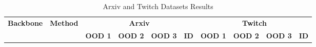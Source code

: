 \documentclass{article}
\begin{document}
\begin{table}[htbp]
\centering
\caption{Arxiv and Twitch Datasets Results}
\label{tab:arxiv_twitch}
\renewcommand{\arraystretch}{1.2} %

\begin{tabular}{c c | c c c c | c c c c}
\toprule

\multirow{2}{*}{\textbf{Backbone}} & \multirow{2}{*}{\textbf{Method}} & \multicolumn{4}{c}{\textbf{Arxiv}} & \multicolumn{4}{c}{\textbf{Twitch}} \\
\cmidrule(lr){3-6} \cmidrule(lr){7-10}
& & \textbf{OOD 1} & \textbf{OOD 2} & \textbf{OOD 3} & \textbf{ID} & \textbf{OOD 1} & \textbf{OOD 2} & \textbf{OOD 3} & \textbf{ID} \\
\midrule


\end{tabular}
\end{table}
\end{document}
